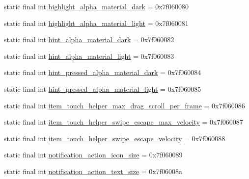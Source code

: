 \begin{DoxyCompactItemize}
\item 
static final int \mbox{\hyperlink{classandroid_1_1support_1_1design_1_1_r_1_1dimen_ad4138b2c901c676ceb97b62ece7c5bad}{highlight\+\_\+alpha\+\_\+material\+\_\+dark}} = 0x7f060080
\item 
static final int \mbox{\hyperlink{classandroid_1_1support_1_1design_1_1_r_1_1dimen_aae4ec3504ac5846750b92f88579b6046}{highlight\+\_\+alpha\+\_\+material\+\_\+light}} = 0x7f060081
\item 
static final int \mbox{\hyperlink{classandroid_1_1support_1_1design_1_1_r_1_1dimen_a3c8e6eb51f33da6ddecd401f27c47851}{hint\+\_\+alpha\+\_\+material\+\_\+dark}} = 0x7f060082
\item 
static final int \mbox{\hyperlink{classandroid_1_1support_1_1design_1_1_r_1_1dimen_a01962e08f9693c909a011603ef73626d}{hint\+\_\+alpha\+\_\+material\+\_\+light}} = 0x7f060083
\item 
static final int \mbox{\hyperlink{classandroid_1_1support_1_1design_1_1_r_1_1dimen_a20b76581b6de81f2298cac2ceef69fcc}{hint\+\_\+pressed\+\_\+alpha\+\_\+material\+\_\+dark}} = 0x7f060084
\item 
static final int \mbox{\hyperlink{classandroid_1_1support_1_1design_1_1_r_1_1dimen_a5df49e66c28b7f17675b0bee01c72283}{hint\+\_\+pressed\+\_\+alpha\+\_\+material\+\_\+light}} = 0x7f060085
\item 
static final int \mbox{\hyperlink{classandroid_1_1support_1_1design_1_1_r_1_1dimen_a07d36d69ceb0dc4c277609d12fdb5bd4}{item\+\_\+touch\+\_\+helper\+\_\+max\+\_\+drag\+\_\+scroll\+\_\+per\+\_\+frame}} = 0x7f060086
\item 
static final int \mbox{\hyperlink{classandroid_1_1support_1_1design_1_1_r_1_1dimen_a3495a45fed6b52fc4ed5416ef815b40d}{item\+\_\+touch\+\_\+helper\+\_\+swipe\+\_\+escape\+\_\+max\+\_\+velocity}} = 0x7f060087
\item 
static final int \mbox{\hyperlink{classandroid_1_1support_1_1design_1_1_r_1_1dimen_a34ee6f178bf059b46f46260979a7bd13}{item\+\_\+touch\+\_\+helper\+\_\+swipe\+\_\+escape\+\_\+velocity}} = 0x7f060088
\item 
static final int \mbox{\hyperlink{classandroid_1_1support_1_1design_1_1_r_1_1dimen_adc30f18b674ab0f94e86853295177a34}{notification\+\_\+action\+\_\+icon\+\_\+size}} = 0x7f060089
\item 
static final int \mbox{\hyperlink{classandroid_1_1support_1_1design_1_1_r_1_1dimen_ae5ee57e8062ed319c805707a3c052700}{notification\+\_\+action\+\_\+text\+\_\+size}} = 0x7f06008a
\item 

\end{DoxyCompactItemize}
